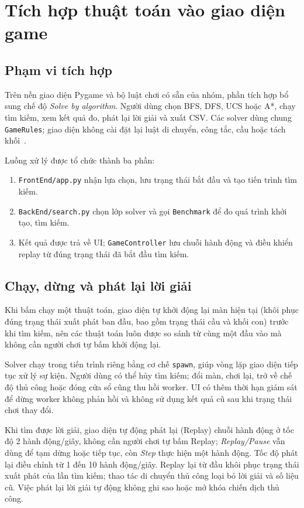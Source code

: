 \section{Tích hợp thuật toán vào giao diện game}
\label{sec:ui_solver}

\subsection{Phạm vi tích hợp}

Trên nền giao diện Pygame và bộ luật chơi có sẵn của nhóm, phần tích hợp
bổ sung chế độ \textit{Solve by algorithm}. Người dùng chọn BFS, DFS, UCS
hoặc A*, chạy tìm kiếm, xem kết quả đo, phát lại lời giải và xuất CSV.
Các solver dùng chung \texttt{GameRules}; giao diện không cài đặt lại luật
di chuyển, công tắc, cầu hoặc tách khối~\cite{bloxorz_ui_source}.

Luồng xử lý được tổ chức thành ba phần:
\begin{enumerate}
    \item \texttt{FrontEnd/app.py} nhận lựa chọn, lưu trạng thái bắt đầu và
    tạo tiến trình tìm kiếm.
    \item \texttt{BackEnd/search.py} chọn lớp solver và gọi
    \texttt{Benchmark} để đo quá trình khởi tạo, tìm kiếm.
    \item Kết quả được trả về UI; \texttt{GameController} lưu chuỗi hành
    động và điều khiển replay từ đúng trạng thái đã bắt đầu tìm kiếm.
\end{enumerate}

\subsection{Chạy, dừng và phát lại lời giải}

Khi bấm chạy một thuật toán, giao diện tự khởi động lại màn hiện tại
(khôi phục đúng trạng thái xuất phát ban đầu, bao gồm trạng thái cầu và
khối con) trước khi tìm kiếm, nên các thuật toán luôn được so sánh từ
cùng một đầu vào mà không cần người chơi tự bấm khởi động lại.

Solver chạy trong tiến trình riêng bằng cơ chế \texttt{spawn}, giúp vòng
lặp giao diện tiếp tục xử lý sự kiện. Người dùng có thể hủy tìm kiếm;
đổi màn, chơi lại, trở về chế độ thủ công hoặc đóng cửa sổ cũng thu hồi
worker. UI có thêm thời hạn giám sát để dừng worker không phản hồi và
không sử dụng kết quả cũ sau khi trạng thái chơi thay đổi.

Khi tìm được lời giải, giao diện tự động phát lại (Replay) chuỗi hành động
ở tốc độ 2 hành động/giây, không cần người chơi tự bấm Replay;
\textit{Replay/Pause} vẫn dùng để tạm dừng hoặc tiếp tục, còn \textit{Step}
thực hiện một hành động. Tốc độ phát lại điều chỉnh từ 1 đến 10 hành
động/giây. Replay lại từ đầu khôi phục trạng thái xuất phát của lần tìm
kiếm; thao tác di chuyển thủ công loại bỏ lời giải và số liệu cũ. Việc
phát lại lời giải tự động không ghi sao hoặc mở khóa
chiến dịch thủ công.

